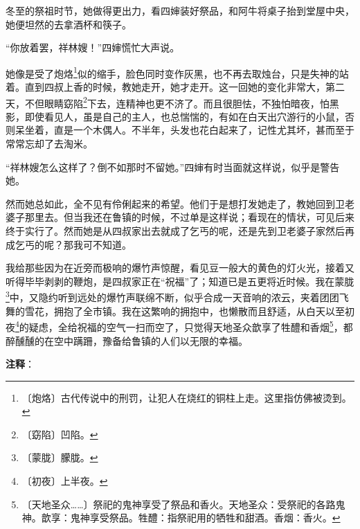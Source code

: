 \documentclass[12pt,UTF-8,openany]{ctexbook}
\begin{document}
\begin{normalsize}
    冬至的祭祖时节，她做得更出力，看四婶装好祭品，和阿牛将桌子抬到堂屋中央，她便坦然的去拿酒杯和筷子。
    
    “你放着罢，祥林嫂！”四婶慌忙大声说。
    
    她像是受了炮烙\footnote{〔炮烙〕古代传说中的刑罚，让犯人在烧红的铜柱上走。这里指仿佛被烫到。}似的缩手，脸色同时变作灰黑，也不再去取烛台，只是失神的站着。直到四叔上香的时候，教她走开，她才走开。这一回她的变化非常大，第二天，不但眼睛窈陷\footnote{〔窈陷〕凹陷。}下去，连精神也更不济了。而且很胆怯，不独怕暗夜，怕黑影，即使看见人，虽是自己的主人，也总惴惴的，有如在白天出穴游行的小鼠，否则呆坐着，直是一个木偶人。不半年，头发也花白起来了，记性尤其坏，甚而至于常常忘却了去淘米。
    
    “祥林嫂怎么这样了？倒不如那时不留她。”四婶有时当面就这样说，似乎是警告她。
    
    然而她总如此，全不见有伶俐起来的希望。他们于是想打发她走了，教她回到卫老婆子那里去。但当我还在鲁镇的时候，不过单是这样说；看现在的情状，可见后来终于实行了。然而她是从四叔家出去就成了乞丐的呢，还是先到卫老婆子家然后再成乞丐的呢？那我可不知道。
    
    我给那些因为在近旁而极响的爆竹声惊醒，看见豆一般大的黄色的灯火光，接着又听得毕毕剥剥的鞭炮，是四叔家正在“祝福”了；知道已是五更将近时候。我在蒙胧\footnote{〔蒙胧〕朦胧。}中，又隐约听到远处的爆竹声联绵不断，似乎合成一天音响的浓云，夹着团团飞舞的雪花，拥抱了全市镇。我在这繁响的拥抱中，也懒散而且舒适，从白天以至初夜\footnote{〔初夜〕上半夜。}的疑虑，全给祝福的空气一扫而空了，只觉得天地圣众歆享了牲醴和香烟\footnote{〔天地圣众……〕祭祀的鬼神享受了祭品和香火。天地圣众：受祭祀的各路鬼神。歆享：鬼神享受祭品。牲醴：指祭祀用的牺牲和甜酒。香烟：香火。}，都醉醺醺的在空中蹒跚，豫备给鲁镇的人们以无限的幸福。
    
\end{normalsize}


\newpage

\textbf{注释}：

\vspace{-1em}
\end{document}
